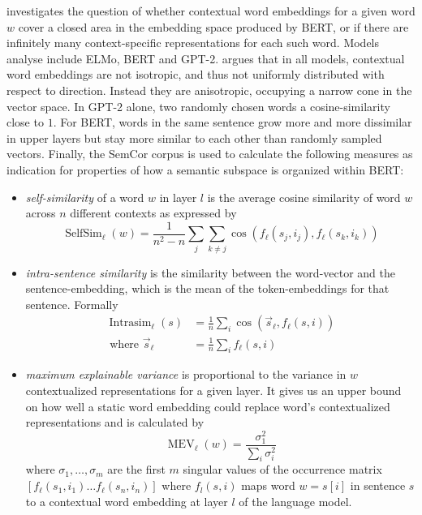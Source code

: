 \documentclass[a4paper,12pt,oneside,openright]{report}
\begin{document}
\cite{ethayarajh19} investigates the question of whether contextual word embeddings for a given word $w$ cover a closed area in the embedding space produced by BERT, or if there are infinitely many context-specific representations for each such word.
Models analyse include ELMo, BERT and GPT-2.
\cite{ethayarajh19} argues that in all models, contextual word embeddings are not isotropic, and thus not uniformly distributed with respect to direction.
Instead they are anisotropic, occupying a narrow cone in the vector space.
In GPT-2 alone, two randomly chosen words a cosine-similarity close to $1$.
For BERT, words in the same sentence grow more and more dissimilar in upper layers but stay more similar to each other than randomly sampled vectors.
Finally, the SemCor corpus is used to calculate the following measures as indication for properties of how a semantic subspace is organized within BERT: \\

\begin{itemize}
\item \textit{self-similarity} of a word $w$ in layer $l$ is the average cosine similarity of word $w$ across $n$ different contexts as expressed by 
$$
\operatorname{SelfSim}_{\ell}(w)=\frac{1}{n^{2}-n} \sum_{j} \sum_{k \neq j} \cos \left(f_{\ell}\left(s_{j}, i_{j}\right), f_{\ell}\left(s_{k}, i_{k}\right)\right)
$$
\item \textit{intra-sentence similarity} is the similarity between the word-vector and the sentence-embedding, which is the mean of the token-embeddings for that sentence. 
Formally
$$
\begin{aligned} \operatorname{Intrasim}_{\ell}(s) &=\frac{1}{n} \sum_{i} \cos \left(\vec{s}_{\ell}, f_{\ell}(s, i)\right) \\ \text { where } \vec{s}_{\ell} &=\frac{1}{n} \sum_{i} f_{\ell}(s, i) \end{aligned}
$$
\item \textit{maximum explainable variance} is proportional to the variance in $w$ contextualized representations for a given layer.
It gives us an upper bound on how well a static word embedding could replace word's contextualized representations and is calculated by 
$$
\operatorname{MEV}_{\ell}(w)=\frac{\sigma_{1}^{2}}{\sum_{i} \sigma_{i}^{2}}
$$
where $\sigma_1, \ldots, \sigma_m$ are the first $m$ singular values of the occurrence matrix $
\left[f_{\ell}\left(s_{1}, i_{1}\right) \ldots f_{\ell}\left(s_{n}, i_{n}\right)\right]
$ where $f_l(s, i)$ maps word $w = s[i]$ in sentence $s$ to a contextual word embedding at layer $l$ of the language model.
\end{itemize}
\end{document}
